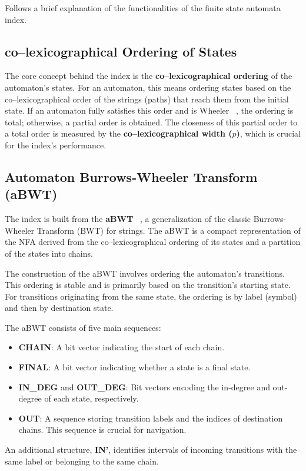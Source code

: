 Follows a brief explanation of the functionalities of the finite state automata index.

\subsection{co--lexicographical Ordering of States}
The core concept behind the index is the \textbf{co--lexicographical ordering} of the automaton's states. For an automaton, this means ordering states based on the co--lexicographical order of the strings (paths) that reach them from the initial state. If an automaton fully satisfies this order and is Wheeler ~\cite{gagie2017wheeler}, the ordering is total; otherwise, a partial order is obtained. The closeness of this partial order to a total order is measured by the \textbf{co--lexicographical width ($p$)}, which is crucial for the index's performance.

\subsection{Automaton Burrows-Wheeler Transform (aBWT)}
The index is built from the \textbf{aBWT} ~\cite{cotumaccio2023co}, a generalization of the classic Burrows-Wheeler Transform (BWT) for strings. The aBWT is a compact representation of the NFA derived from the co--lexicographical ordering of its states and a partition of the states into chains.

The construction of the aBWT involves ordering the automaton's transitions. This ordering is stable and is primarily based on the transition's starting state. For transitions originating from the same state, the ordering is by label (symbol) and then by destination state.

The aBWT consists of five main sequences:
\begin{itemize}
    \item \textbf{CHAIN}: A bit vector indicating the start of each chain.
    \item \textbf{FINAL}: A bit vector indicating whether a state is a final state.
    \item \textbf{IN\_DEG} and \textbf{OUT\_DEG}: Bit vectors encoding the in-degree and out-degree of each state, respectively.
    \item \textbf{OUT}: A sequence storing transition labels and the indices of destination chains. This sequence is crucial for navigation.
\end{itemize}
An additional structure, \textbf{IN'}, identifies intervals of incoming transitions with the same label or belonging to the same chain.

